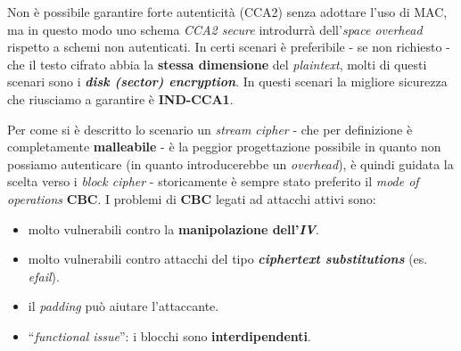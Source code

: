\begin{flushleft}
    Non è possibile garantire forte autenticità (CCA2) senza adottare l'uso di MAC, ma in questo modo uno schema \textit{CCA2 secure} introdurrà dell'\textit{space overhead} rispetto a schemi non autenticati. In certi scenari è preferibile - se non richiesto - che il testo cifrato abbia la \textbf{stessa dimensione} del \textit{plaintext}, molti di questi scenari sono i \textbf{\textit{disk (sector) encryption}}. In questi scenari la migliore sicurezza che riusciamo a garantire è \textbf{IND-CCA1}.

    \smallskip

    Per come si è descritto lo scenario un \textit{stream cipher} - che per definizione è completamente \textbf{malleabile} - è la peggior progettazione possibile in quanto non possiamo autenticare (in quanto introducerebbe un \textit{overhead}), è quindi guidata la scelta verso i \textit{block cipher} - storicamente è sempre stato preferito il \textit{mode of operations} \textbf{CBC}. I problemi di \textbf{CBC} legati ad attacchi attivi sono:
    \begin{itemize}[nosep]
        \item molto vulnerabili contro la \textbf{manipolazione dell'\textit{IV}}.
        \item molto vulnerabili contro attacchi del tipo \textbf{\textit{ciphertext substitutions}} (es. \textit{efail}).
        \item il \textit{padding} può aiutare l'attaccante.
        \item ``\textit{functional issue}'': i blocchi sono \textbf{interdipendenti}.
    \end{itemize}

    \smallskip


\end{flushleft}
